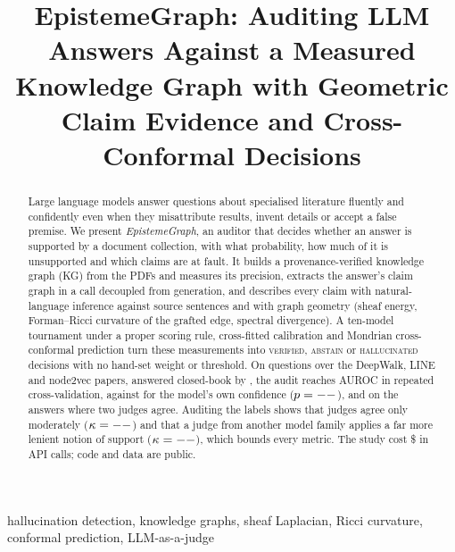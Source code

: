 \documentclass[conference]{IEEEtran}
\begin{document}
\title{EpistemeGraph: Auditing LLM Answers Against a Measured Knowledge Graph with Geometric Claim Evidence and Cross-Conformal Decisions}

\author{
}

\maketitle

\begin{abstract}
Large language models answer questions about specialised literature fluently and confidently even when they
misattribute results, invent details or accept a false premise. We present \emph{EpistemeGraph}, an auditor that
decides whether an answer is supported by a document collection, with what probability, how much of it is unsupported
and which claims are at fault. It builds a provenance-verified knowledge graph (KG) from the PDFs and measures its
precision, extracts the answer's claim graph in a call decoupled from generation, and describes every claim with
natural-language inference against source sentences and with graph geometry (sheaf energy, Forman--Ricci curvature of
the grafted edge, spectral divergence). A ten-model tournament under a proper scoring rule, cross-fitted calibration
and Mondrian cross-conformal prediction turn these measurements into \textsc{verified}, \textsc{abstain} or
\textsc{hallucinated} decisions with no hand-set weight or threshold. On \NItems{} questions over the DeepWalk, LINE and
node2vec papers, answered closed-book by \texttt{\AnswerModel}, the audit reaches AUROC \CVAUC{} in repeated
cross-validation, against \CVAUCllm{} for the model's own confidence ($p=--$), and \ConsensusAUC{} on the answers
where two judges agree. Auditing the labels shows that judges agree only moderately ($\kappa=--$) and that a
judge from another model family applies a far more lenient notion of support ($\kappa=--$), which bounds every
metric. The study cost \$\CostRun{} in API calls; code and data are public.
\end{abstract}

\begin{IEEEkeywords}
hallucination detection, knowledge graphs, sheaf Laplacian, Ricci curvature, conformal prediction, LLM-as-a-judge
\end{IEEEkeywords}
\end{document}
